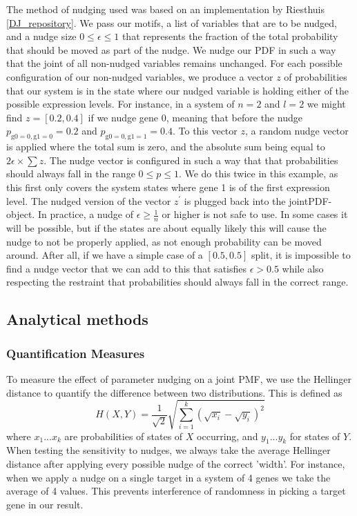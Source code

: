 \documentclass[../main.tex]{subfiles}
\begin{document}
The method of nudging used was based on an implementation by Riesthuis \ref{DJ_repository}.
We pass our motifs, a list of variables that are to be nudged, and a nudge size $0 \le \epsilon \le 1$ that represents the fraction of the total probability that should be moved as part of the nudge.
We nudge our PDF in such a way that the joint of all non-nudged variables remains unchanged.
For each possible configuration of our non-nudged variables, we produce a vector $z$ of probabilities that our system is in the state where our nudged variable is holding either of the possible expression levels.
For instance, in a system of $n=2$ and $l=2$ we might find $z = [0.2, 0.4]$ if we nudge gene 0, meaning that before the nudge $p_\mathrm{g0 = 0, g1=0} = 0.2$ and $p_\mathrm{g0 = 0, g1=1} = 0.4$.
To this vector $z$, a random nudge vector is applied where the total sum is zero, and the absolute sum being equal to $2 \epsilon \times \sum z$.
The nudge vector is configured in such a way that that probabilities should always fall in the range $0 \le p \le 1$.
We do this twice in this example, as this first only covers the system states where gene 1 is of the first expression level.
The nudged version of the vector $z^\prime$ is plugged back into the jointPDF-object.
In practice, a nudge of $\epsilon \ge \frac{1}{n}$ or higher is not safe to use.
In some cases it will be possible, but if the states are about equally likely this will cause the nudge to not be properly applied, as not enough probability can be moved around.
After all, if we have a simple case of a $[0.5, 0.5]$ split, it is impossible to find a nudge vector that we can add to this that satisfies $\epsilon > 0.5$ while also respecting the restraint that probabilities should always fall in the correct range.

\subsection{Analytical methods}

\subsubsection{Quantification Measures}

To measure the effect of parameter nudging on a joint PMF, we use the Hellinger distance to quantify the difference between two distributions.
This is defined as
%
\begin{equation}
H(X, Y) = \frac{1}{\sqrt{2}} \sqrt{\sum^k_{i=1} (\sqrt{x_i} - \sqrt{y_i})^2}
\end{equation}
%
where ${x_1 ... x_k}$ are probabilities of states of $X$ occurring, and ${y_1 ... y_k}$ for states of $Y$.
When testing the sensitivity to nudges, we always take the average Hellinger distance after applying every possible nudge of the correct 'width'.
For instance, when we apply a nudge on a single target in a system of 4 genes we take the average of 4 values.
This prevents interference of randomness in picking a target gene in our result.
\end{document}
